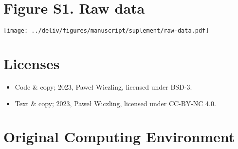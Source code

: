 \documentclass[
]{article}
\providecommand{\tightlist}{%
  \setlength{\itemsep}{0pt}\setlength{\parskip}{0pt}}\usepackage{longtable,booktabs,array}
\begin{document}
\newpage{}

\hypertarget{figure-s1.-raw-data}{%
\section{Figure S1. Raw data}\label{figure-s1.-raw-data}}

\texttt{[image: ../deliv/figures/manuscript/suplement/raw-data.pdf]}

\newpage{}

\hypertarget{licenses}{%
\section*{Licenses}\label{licenses}}

\begin{itemize}
\tightlist
\item
  Code \& copy; 2023, Paweł Wiczling, licensed under BSD-3.
\item
  Text \& copy; 2023, Paweł Wiczling, licensed under CC-BY-NC 4.0.
\end{itemize}

\hypertarget{original-computing-environment}{%
\section*{Original Computing
Environment}\label{original-computing-environment}}
\end{document}

